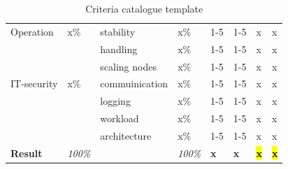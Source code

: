 \documentclass[MSC,Master,english]{twbook}%
\begin{document}
\begin{table}[ht]
\begin{center}
{\begin{tabular}{|l|l|l|l|l|l|l|l|}
            \hline
            Operation & x\% & stability & x\% & 1-5 & 1-5 & x & x \\
            & & handling & x\% & 1-5 & 1-5 & x & x \\
            & & scaling nodes & x\% & 1-5 & 1-5 & x & x \\
            \hline
            IT-security & x\% & commuinication & x\% & 1-5 & 1-5 & x & x \\
            & & logging & x\% & 1-5 & 1-5 & x & x \\
            & & workload & x\% & 1-5 & 1-5 & x & x \\
            & & architecture & x\% & 1-5 & 1-5 & x & x \\
            \hline \hline
            \textbf{Result} & \textit{100\%} & & \textit{100\%} & \textbf{x} & \textbf{x} & \hl{\textbf{x}} & \hl{\textbf{x}} \\
            \hline
        \end{tabular}}
        \caption{Criteria catalogue template}
        \label{tab:cctt}
    \end{center}
\end{table}
\end{document}
